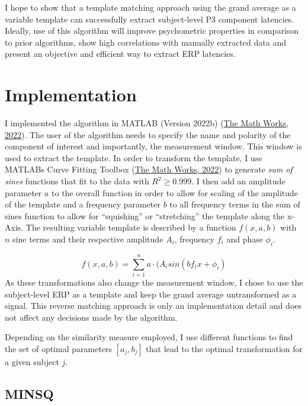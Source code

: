 \documentclass[
  man]{apa7}
\begin{document}
I hope to show that a template matching approach using the grand average as a variable template can successfully extract subject-level P3 component latencies. Ideally, use of this algorithm will improve psychometric properties in comparison to prior algorithms, show high correlations with manually extracted data and present an objective and efficient way to extract ERP latencies.

\hypertarget{implementation}{%
\section{Implementation}\label{implementation}}

I implemented the algorithm in MATLAB (Version 2022b) (\protect\hyperlink{ref-matlab2022b}{The Math Works, 2022}). The user of the algorithm needs to specify the name and polarity of the component of interest and importantly, the measurement window. This window is used to extract the template. In order to transform the template, I use MATLABs Curve Fitting Toolbox (\protect\hyperlink{ref-matlab2022b}{The Math Works, 2022}) to generate \emph{sum of sines} functions that fit to the data with \(R^2 \ge 0.999\). I then add an amplitude parameter \(a\) to the overall function in order to allow for scaling of the amplitude of the template and a frequency parameter \(b\) to all frequency terms in the sum of sines function to allow for ``squishing'' or ``stretching'' the template along the x-Axis. The resulting variable template is described by a function \(f(x, a, b)\) with \(n\) sine terms and their respective amplitude \(A_i\), frequency \(f_i\) and phase \(\phi_i\).

\[f(x, a, b) = \sum_{i = 1}^{n} a\cdot(A_isin(bf_ix + \phi_i)\]
As these transformations also change the measurement window, I chose to use the subject-level ERP as a template and keep the grand average untransformed as a signal. This reverse matching approach is only an implementation detail and does not affect any decisions made by the algorithm.

Depending on the similarity measure employed, I use different functions to find the set of optimal parameters \([a_j, b_j]\) that lead to the optimal transformation for a given subject \(j\).

\hypertarget{minsq}{%
\subsection{MINSQ}\label{minsq}}
\end{document}
